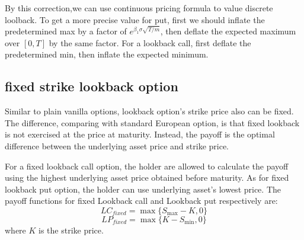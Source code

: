 \documentclass[11pt]{book}
\begin{document}
By this correction,we can use continuous pricing formula
to value discrete loolback. To get a more precise value for put,
first we should inflate the predetermined max by a factor of
$e^{\beta_1 \sigma \sqrt{T/m}}$,
then deflate the expected maximum over $[0,T]$ by the same factor. For a lookback call, first deflate the predetermined min, then inflate the expected minimum.

\subsection{fixed strike lookback option}
Similar to plain vanilla options, lookback option's strike price also can be fixed. The difference, comparing with standard European option, is that fixed lookback is not exercised at the price at maturity.  Instead, the payoff is the optimal difference between the underlying asset price and strike price. 

For a fixed lookback call option, the holder are allowed to calculate the payoff using the highest underlying asset price obtained before maturity. As for fixed lookback put option, the holder can use underlying asset's lowest price. The payoff functions for fixed Lookback call and  Lookback put respectively are:
\begin{equation}
LC_{fixed} = \max\{S_{\max} - K, 0\} 
\end{equation}
\begin{equation}
LP_{fixed}= \max\{K-S_{\min},0\}
\end{equation}
where $K$ is the strike price.
\end{document}
